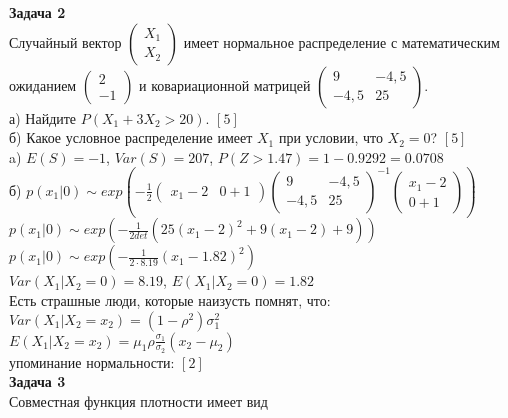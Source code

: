 \documentclass[pdftex,12pt,a4paper]{article}
\begin{document}
\textbf{Задача 2} \\ %
Случайный вектор  $\left(\begin{array}{c}
{X_{1} } \\ {X_{2} }
\end{array}\right)$  имеет нормальное распределение с
математическим ожиданием  $\left(\begin{array}{c} {2} \\ {-1}
\end{array}\right)$  и ковариационной матрицей
$\left(\begin{array}{cc} {9} & {-4,5} \\ {-4,5} & {25}
\end{array}\right)$. \\
а) Найдите  $P\left(X_{1} +3X_{2} >20\right)$. $[5]$ \\
б) Какое условное распределение имеет $X_{1}$ при условии, что $X_{2}=0$? $[5]$ \\
a) $E(S)=-1$, $Var(S)=207$, $P(Z>1.47)=1-0.9292=0.0708$ \\
б) $p(x_{1}|0)\sim exp\left(-\frac{1}{2}\left(\begin{array}{cc} {x_{1}-2} & {0+1} \end{array}\right) \left(\begin{array}{cc} {9} & {-4,5} \\ {-4,5} & {25}
\end{array}\right)^{-1}\left(\begin{array}{c} {x_{1}-2} \\ {0+1}
\end{array}\right)\right)$ \\
$p(x_{1}|0)\sim exp\left(-\frac{1}{2det}(25(x_{1}-2)^{2}+9(x_{1}-2)+9)\right)$ \\
$p(x_{1}|0)\sim exp\left(-\frac{1}{2\cdot 8.19}(x_{1}-1.82)^{2}\right)$ \\
$Var(X_{1}|X_{2}=0)=8.19$, $E(X_{1}|X_{2}=0)=1.82$ \\
Есть страшные люди, которые наизусть помнят, что: \\
$Var(X_{1}|X_{2}=x_{2})=(1-\rho^{2})\sigma_{1}^{2}$ \\
$E(X_{1}|X_{2}=x_{2})=\mu_{1}\rho\frac{\sigma_{1}}{\sigma_{2}}(x_{2}-\mu_{2})$ \\
упоминание нормальности: $[2]$ \\

\textbf{Задача 3} \\ %
Совместная функция плотности имеет вид
\end{document}
